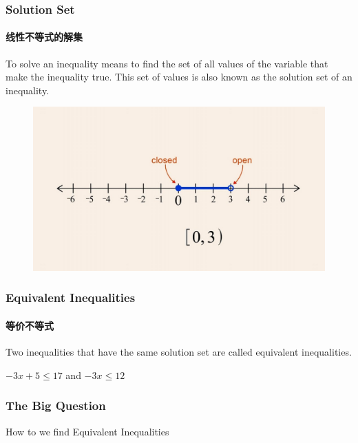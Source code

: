 \documentclass[
	11pt, %
]{beamer}
\begin{document}

\begin{frame}
	\frametitle{Solution Set}
	\framesubtitle{线性不等式的解集}
	\begin{definition}
			To solve an inequality means to find the set of all values of the variable that make the inequality true. This set of values is also known as the \alert{solution set} of an inequality.
	\end{definition}
	
	\smallskip %
		
	\begin{figure}
		\includegraphics[width=0.8\linewidth]{Solution_Set.jpeg}
	\end{figure}

\end{frame}

\begin{frame}
	\frametitle{Equivalent Inequalities}
	\framesubtitle{等价不等式}
	\begin{definition}
		Two inequalities that have the \alert{same} solution set are called equivalent inequalities.
	\end{definition}
	
	\smallskip %
	
	\begin{example}
  $-3x +5 \leq 17 $ and $-3x \leq 12$
	\end{example}
	\end{frame}
	

\begin{frame}
	\frametitle{The Big Question }
	{\LARGE How to we find Equivalent Inequalities}

\end{frame}
\end{document}

